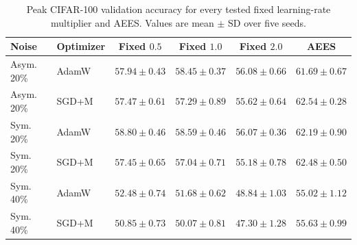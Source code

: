 \begin{table}[H]
\centering
\caption{Peak CIFAR-100 validation accuracy for every tested fixed
learning-rate multiplier and AEES. Values are mean $\pm$ SD over five seeds.}
\label{tab:appendix-all-fixed}
\scriptsize
\setlength{\tabcolsep}{3.0pt}
\renewcommand{\arraystretch}{1.03}
\begin{tabular}{llcccc}
\toprule
Noise & Optimizer & Fixed $0.5$ & Fixed $1.0$ & Fixed $2.0$ & AEES \\
\midrule
Asym. 20\% & AdamW & $57.94\pm0.43$ & $58.45\pm0.37$ & $56.08\pm0.66$ & $61.69\pm0.67$ \\
Asym. 20\% & SGD+M & $57.47\pm0.61$ & $57.29\pm0.89$ & $55.62\pm0.64$ & $62.54\pm0.28$ \\
Sym. 20\% & AdamW & $58.80\pm0.46$ & $58.59\pm0.46$ & $56.07\pm0.36$ & $62.19\pm0.90$ \\
Sym. 20\% & SGD+M & $57.45\pm0.65$ & $57.04\pm0.71$ & $55.18\pm0.78$ & $62.48\pm0.50$ \\
Sym. 40\% & AdamW & $52.48\pm0.74$ & $51.68\pm0.62$ & $48.84\pm1.03$ & $55.02\pm1.12$ \\
Sym. 40\% & SGD+M & $50.85\pm0.73$ & $50.07\pm0.81$ & $47.30\pm1.28$ & $55.63\pm0.99$ \\
\bottomrule
\end{tabular}
\end{table}
